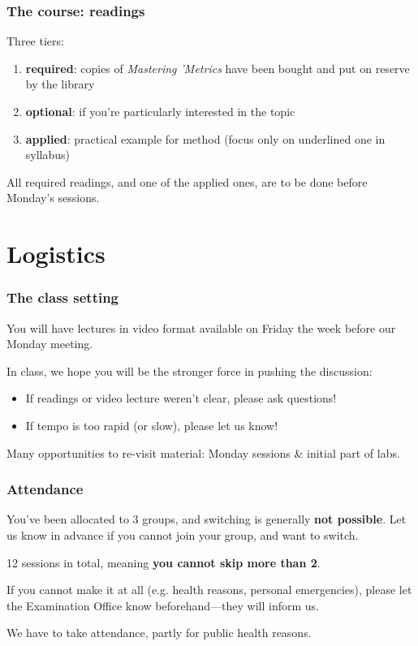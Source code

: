 \documentclass[12pt,english,dvipsnames,aspectratio=169, handout]{beamer}
\begin{document}
\begin{frame}
	\frametitle{The course: readings}
	Three tiers:
	
	\begin{enumerate}
		\setlength\itemsep{1em}
		\item \textbf{required}: copies of \textit{Mastering 'Metrics} have been bought and put on reserve by the library
		\item \textbf{optional}: if you're particularly interested in the topic
		\item \textbf{applied}: practical example for method (focus only on underlined one in syllabus)
	\end{enumerate}
	
	All required readings, and one of the applied ones, are to be done before Monday's sessions.
	
\end{frame}


\section{Logistics}
\begin{frame}
	\frametitle{The class setting}
	You will have lectures in video format available on Friday the week before our Monday meeting.\bigskip
	
	In class, we hope you will be the stronger force in pushing the discussion:
	
	\begin{itemize}
		\item If readings or video lecture weren't clear, please ask questions!
		\item If tempo is too rapid (or slow), please let us know!
	\end{itemize}

    Many opportunities to re-visit material: Monday sessions \& initial part of labs.
	
\end{frame}


\begin{frame}
	\frametitle{Attendance}
	You've been allocated to 3 groups, and switching is generally \textbf{not possible}. Let us know in advance if you cannot join your group, and want to switch.\bigskip
	
	12 sessions in total, meaning \textbf{you cannot skip more than 2}.\bigskip
	
	If you cannot make it at all (e.g. health reasons, personal emergencies), please let the Examination Office know beforehand---they will inform us.\bigskip
	
	We have to take attendance, partly for public health reasons.
	
\end{frame}
\end{document}
